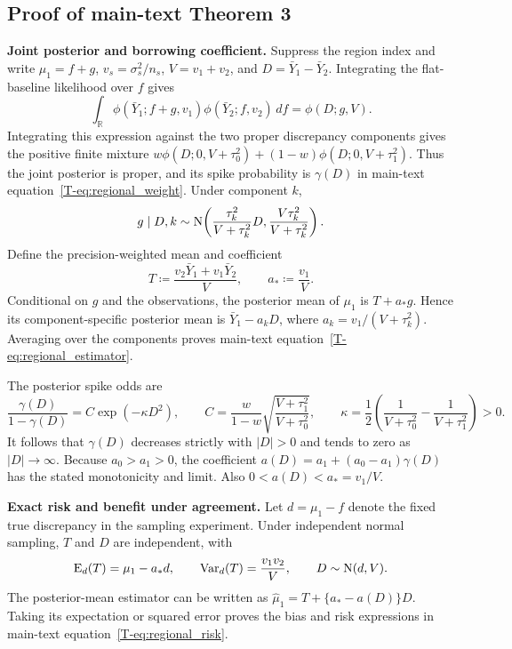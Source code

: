 \subsection{Proof of main-text Theorem 3}\label{sec:C.3}
\noindent\textbf{Joint posterior and borrowing coefficient.}
Suppress the region index and write $\mu_1=f+g$, $v_s=\sigma_s^2/n_s$, $V=v_1+v_2$, and $D=\bar Y_1-\bar Y_2$. Integrating the flat-baseline likelihood over $f$ gives
\begin{equation}\label{eq:regional_flat_integral}
\int_{\mathbb R}\phi(\bar Y_1;f+g,v_1)\phi(\bar Y_2;f,v_2)\,df
=\phi(D;g,V).
\end{equation}
Integrating this expression against the two proper discrepancy components gives the positive finite mixture $w\phi(D;0,V+\tau_0^2)+(1-w)\phi(D;0,V+\tau_1^2)$. Thus the joint posterior is proper, and its spike probability is $\gamma(D)$ in main-text equation~\eqref{T-eq:regional_weight}. Under component $k$,
\[
g\mid D,k\sim\mathrm{N}\!\left(\frac{\tau_k^2}{V+\tau_k^2}D,
\frac{V\tau_k^2}{V+\tau_k^2}\right).
\]
Define the precision-weighted mean and coefficient
\begin{equation}\label{eq:regional_T}
T\coloneqq\frac{v_2\bar Y_1+v_1\bar Y_2}{V},\qquad a_*\coloneqq\frac{v_1}{V}.
\end{equation}
Conditional on $g$ and the observations, the posterior mean of $\mu_1$ is $T+a_*g$. Hence its component-specific posterior mean is $\bar Y_1-a_kD$, where $a_k=v_1/(V+\tau_k^2)$. Averaging over the components proves main-text equation~\eqref{T-eq:regional_estimator}.

The posterior spike odds are
\begin{equation}\label{eq:regional_odds}
\frac{\gamma(D)}{1-\gamma(D)}
=C\exp(-\kappa D^2),\qquad
C=\frac{w}{1-w}\sqrt{\frac{V+\tau_1^2}{V+\tau_0^2}},\qquad
\kappa=\frac12\left(\frac1{V+\tau_0^2}-\frac1{V+\tau_1^2}\right)>0.
\end{equation}
It follows that $\gamma(D)$ decreases strictly with $|D|>0$ and tends to zero as $|D|\to\infty$. Because $a_0>a_1>0$, the coefficient $a(D)=a_1+(a_0-a_1)\gamma(D)$ has the stated monotonicity and limit. Also $0<a(D)<a_*=v_1/V$.

\noindent\textbf{Exact risk and benefit under agreement.}
Let $d=\mu_1-f$ denote the fixed true discrepancy in the sampling experiment. Under independent normal sampling, $T$ and $D$ are independent, with
\begin{equation}\label{eq:regional_T_distribution}
\operatorname{E}_d(T)=\mu_1-a_*d,\qquad
\operatorname{Var}_d(T)=\frac{v_1v_2}{V},\qquad D\sim\mathrm{N}(d,V).
\end{equation}
The posterior-mean estimator can be written as $\widehat\mu_1=T+\{a_*-a(D)\}D$. Taking its expectation or squared error proves the bias and risk expressions in main-text equation~\eqref{T-eq:regional_risk}.

